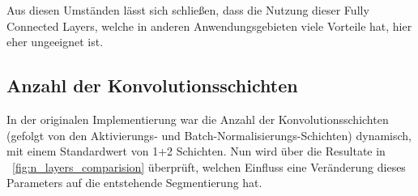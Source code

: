 Aus diesen Umständen lässt sich schließen, dass die Nutzung dieser Fully Connected Layers, welche in anderen Anwendungsgebieten viele Vorteile hat, hier eher ungeeignet ist.

\subsection{Anzahl der Konvolutionsschichten}
\label{ssec:exp_n_convolutions}

In der originalen Implementierung war die Anzahl der Konvolutionsschichten (gefolgt von den Aktivierungs- und Batch-Normalisierungs-Schichten) dynamisch, mit einem Standardwert von 1+2 Schichten. Nun wird über die Resultate in \figurename~\ref{fig:n_layers_comparision} überprüft, welchen Einfluss eine Veränderung dieses Parameters auf die entstehende Segmentierung hat.

